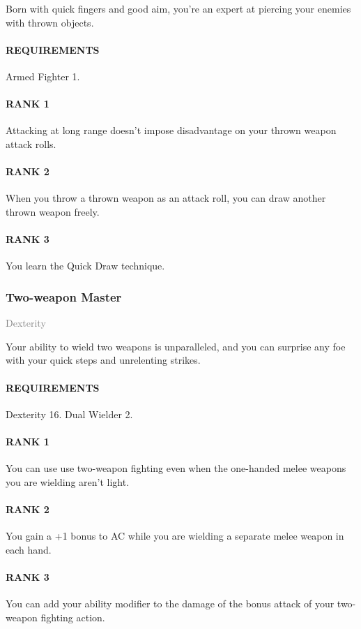 \normalsize
Born with quick fingers and good aim, you're an expert at piercing your enemies with thrown objects.
\paragraph{REQUIREMENTS} Armed Fighter 1.
\paragraph{RANK 1} Attacking at long range doesn't impose disadvantage on your thrown weapon attack rolls.
\paragraph{RANK 2} When you throw a thrown weapon as an attack roll, you can draw another thrown weapon freely.
\paragraph{RANK 3} You learn the Quick Draw technique.

\subsubsection{Two-weapon Master} \label{feat::twoweaponmaster}
\small{\textcolor{gray}{Dexterity}}

\normalsize
Your ability to wield two weapons is unparalleled, and you can surprise any foe with your quick steps and unrelenting strikes.
\paragraph{REQUIREMENTS} Dexterity 16. Dual Wielder 2.
\paragraph{RANK 1} You can use use two-weapon fighting even when the one-handed melee weapons you are wielding aren't light.
\paragraph{RANK 2} You gain a +1 bonus to AC while you are wielding a separate melee weapon in each hand.
\paragraph{RANK 3} You can add your ability modifier to the damage of the bonus attack of your two-weapon fighting action.

